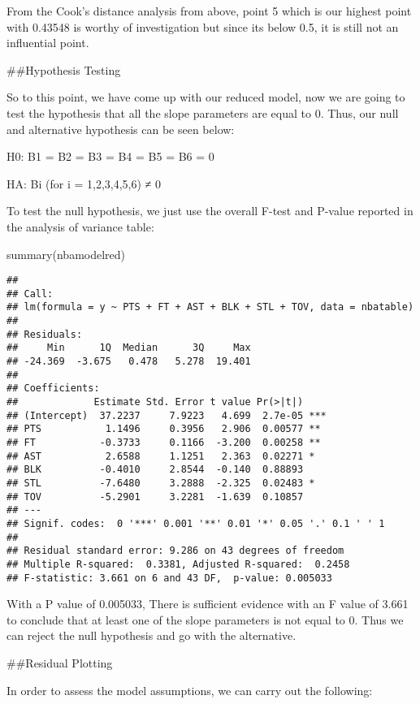\documentclass[
]{article}
\newenvironment{Shaded}{\begin{snugshade}}{\end{snugshade}}
\newcommand{\FunctionTok}[1]{\textcolor[rgb]{0.00,0.00,0.00}{#1}}
\newcommand{\NormalTok}[1]{#1}
\begin{document}
From the Cook's distance analysis from above, point 5 which is our
highest point with 0.43548 is worthy of investigation but since its
below 0.5, it is still not an influential point.

\#\#Hypothesis Testing

So to this point, we have come up with our reduced model, now we are
going to test the hypothesis that all the slope parameters are equal to
0. Thus, our null and alternative hypothesis can be seen below:

H0: B1 = B2 = B3 = B4 = B5 = B6 = 0

HA: Bi (for i = 1,2,3,4,5,6) ≠ 0

To test the null hypothesis, we just use the overall F-test and P-value
reported in the analysis of variance table:

\begin{Shaded}
\begin{Highlighting}[]
\FunctionTok{summary}\NormalTok{(nbamodelred)}
\end{Highlighting}
\end{Shaded}

\begin{verbatim}
## 
## Call:
## lm(formula = y ~ PTS + FT + AST + BLK + STL + TOV, data = nbatable)
## 
## Residuals:
##     Min      1Q  Median      3Q     Max 
## -24.369  -3.675   0.478   5.278  19.401 
## 
## Coefficients:
##             Estimate Std. Error t value Pr(>|t|)    
## (Intercept)  37.2237     7.9223   4.699  2.7e-05 ***
## PTS           1.1496     0.3956   2.906  0.00577 ** 
## FT           -0.3733     0.1166  -3.200  0.00258 ** 
## AST           2.6588     1.1251   2.363  0.02271 *  
## BLK          -0.4010     2.8544  -0.140  0.88893    
## STL          -7.6480     3.2888  -2.325  0.02483 *  
## TOV          -5.2901     3.2281  -1.639  0.10857    
## ---
## Signif. codes:  0 '***' 0.001 '**' 0.01 '*' 0.05 '.' 0.1 ' ' 1
## 
## Residual standard error: 9.286 on 43 degrees of freedom
## Multiple R-squared:  0.3381, Adjusted R-squared:  0.2458 
## F-statistic: 3.661 on 6 and 43 DF,  p-value: 0.005033
\end{verbatim}

With a P value of 0.005033, There is sufficient evidence with an F value
of 3.661 to conclude that at least one of the slope parameters is not
equal to 0. Thus we can reject the null hypothesis and go with the
alternative.

\#\#Residual Plotting

In order to assess the model assumptions, we can carry out the
following:
\end{document}
